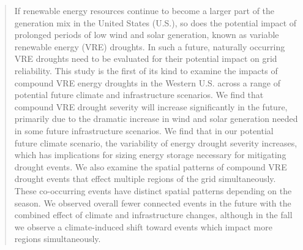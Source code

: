 \documentclass{agujournal2019}
\begin{document}
\begin{abstract}
If renewable energy resources continue to become a larger part of the generation mix in the United States (U.S.), so does the potential impact of prolonged periods of low wind and solar generation, known as variable renewable energy (VRE) droughts. In such a future, naturally occurring VRE droughts need to be evaluated for their potential impact on grid reliability. This study is the first of its kind to examine the impacts of compound VRE energy droughts in the Western U.S. across a range of potential future climate and infrastructure scenarios. We find that compound VRE drought severity will increase significantly in the future, primarily due to the dramatic increase in wind and solar generation needed in some future infrastructure scenarios. We find that in our potential future climate scenario, the variability of energy drought severity increases, which has implications for sizing energy storage necessary for mitigating drought events. We also examine the spatial patterns of compound VRE drought events that effect multiple regions of the grid simultaneously. These co-occurring events have distinct spatial patterns depending on the season. We observed overall fewer connected events in the future with the combined effect of climate and infrastructure changes, although in the fall we observe a climate-induced shift toward events which impact more regions simultaneously. 
\end{abstract}





%
%

%
\end{document}
